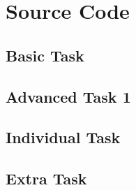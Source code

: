 \renewcommand{\thesection}{Appendix C}
\renewcommand{\thesubsection}{}
\section{Source Code}

\subsection{Basic Task}




\subsection{Advanced Task 1}






\subsection{Individual Task}


\subsection{Extra Task}





